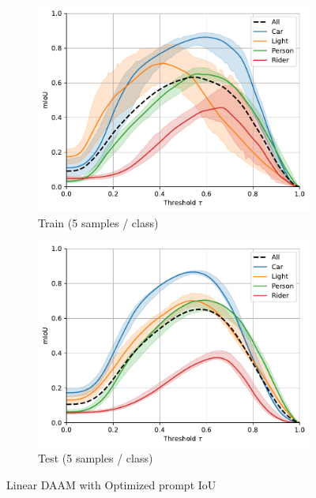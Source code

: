 \begin{figure}
\begin{subfigure}{0.49\columnwidth}
   \includegraphics[width=\columnwidth]{img/4-experiments/heatmap-optimized-iou-5-300-train.pdf}
   \caption{Train (5 samples / class)}
   \label{fig:miou-optimized-ious-train-5}
  \end{subfigure}
  \begin{subfigure}{0.49\columnwidth}
   \includegraphics[width=\columnwidth]{img/4-experiments/heatmap-optimized-iou-5-300-test.pdf}
   \caption{Test (5 samples / class)}
   \label{fig:miou-optimized-ious-test-5}
  \end{subfigure}
  
  \caption[Linear DAAM with Optimized prompt IoU]{Linear DAAM with Optimized prompt IoU}
  \label{fig:miou-optimized-ious}
  \end{figure}




